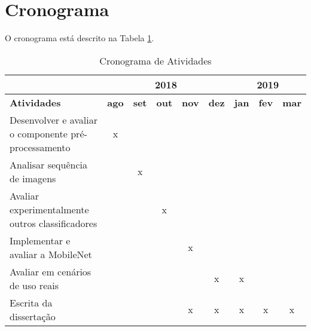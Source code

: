 
\section{Cronograma}\label{sec:cronograma}
O cronograma está descrito na Tabela \ref{table:cronog}.

\begin{table}[ht]\footnotesize
\caption{Cronograma de Atividades}
\label{table:cronog}
\begin{tabular}{l|ccccc|ccc|}
\cline{2-9}
                                                                           & \multicolumn{5}{c|}{\textbf{2018}}                                       & \multicolumn{3}{c|}{\textbf{2019}}         \\ \hline
\multicolumn{1}{|l|}{\textbf{Atividades}}                                  & \textbf{ago} & \textbf{set} & \textbf{out} & \textbf{nov} & \textbf{dez} & \textbf{jan} & \textbf{fev} & \textbf{mar} \\ \hline
\multicolumn{1}{|l|}{Desenvolver e avaliar o componente pré-processamento} & x            &              &              &              &              &              &              &              \\
\multicolumn{1}{|l|}{Analisar sequência de imagens}                        &              & x            &              &              &              &              &              &              \\
\multicolumn{1}{|l|}{Avaliar experimentalmente outros classificadores}     &              &              & x            &              &              &              &              &              \\
\multicolumn{1}{|l|}{Implementar e avaliar a MobileNet}                    &              &              &              & x            &              &              &              &              \\
\multicolumn{1}{|l|}{Avaliar em cenários de uso reais}                     &              &              &              &              & x            & x            &              &              \\
\multicolumn{1}{|l|}{Escrita da dissertação}                                  &              &              &              & x            & x            & x            & x            & x            \\ \hline
\end{tabular}
\end{table}


% 
